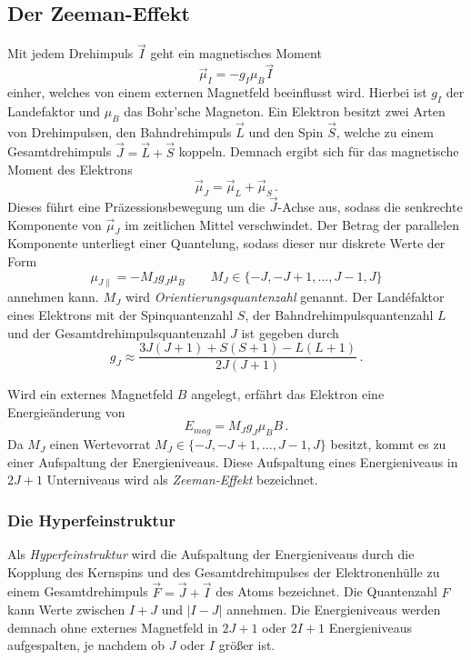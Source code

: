 \subsection{Der Zeeman-Effekt}
Mit jedem Drehimpuls $\vec{I}$ geht ein magnetisches Moment
\begin{equation}
\vec{\mu}_I = -g_I \mu_B \vec{I}
\end{equation}
einher, welches von einem externen Magnetfeld beeinflusst wird.
Hierbei ist $g_I$ der Landefaktor und $\mu_B$ das Bohr'sche Magneton.
Ein Elektron besitzt zwei Arten von Drehimpulsen, den Bahndrehimpuls $\vec{L}$ und den Spin $\vec{S}$, welche zu einem Gesamtdrehimpuls $\vec{J} = \vec{L} + \vec{S}$ koppeln.
Demnach ergibt sich für das magnetische Moment des Elektrons
\begin{equation}
\vec{\mu}_J = \vec{\mu}_L + \vec{\mu}_S \, .
\end{equation}
Dieses führt eine Präzessionsbewegung um die $\vec{J}$-Achse aus, sodass die senkrechte Komponente von $\vec{\mu}_J$ im zeitlichen Mittel verschwindet.
Der Betrag der parallelen Komponente unterliegt einer Quantelung, sodass dieser nur diskrete Werte der Form
\begin{equation}
\mu_{J\parallel} = - M_J g_J \mu_B \qquad M_J \in \{-J, -J+1, ..., J-1, J\}
\end{equation}
annehmen kann. 
$M_J$ wird \textit{Orientierungsquantenzahl} genannt.
Der Landéfaktor eines Elektrons mit der Spinquantenzahl $S$, der Bahndrehimpulsquantenzahl $L$ und der Gesamtdrehimpulsquantenzahl $J$ ist gegeben durch
\begin{equation}
    \label{eq:afrika}
g_J \approx \frac{3 J(J+1)+S(S+1)- L(L+1)}{2J(J+1)}\, .
\end{equation}

Wird ein externes Magnetfeld $B$ angelegt, erfährt das Elektron eine Energieänderung von
\begin{equation}\label{eq:deltaE}
E_{mag} = M_J g_J \mu_B B \, .
\end{equation}
Da $M_J$ einen Wertevorrat $M_J \in \{-J, -J+1, ..., J-1, J\}$ besitzt, kommt es zu einer Aufspaltung der Energieniveaus.
Diese Aufspaltung eines Energieniveaus in $2J+1$ Unterniveaus wird als \textit{Zeeman-Effekt} bezeichnet.

\subsubsection*{Die Hyperfeinstruktur}
Als \textit{Hyperfeinstruktur} wird die Aufspaltung der Energieniveaus durch die Kopplung des Kernspins und des Gesamtdrehimpulses der Elektronenhülle zu einem Gesamtdrehimpuls $\vec{F} = \vec{J} + \vec{I}$ des Atoms bezeichnet.
Die Quantenzahl $F$ kann Werte zwischen $I+J$ und $|I-J|$ annehmen.
Die Energieniveaus werden demnach ohne externes Magnetfeld in $2J+1$ oder $2I+1$ Energieniveaus aufgespalten, je nachdem ob $J$ oder $I$ größer ist.

